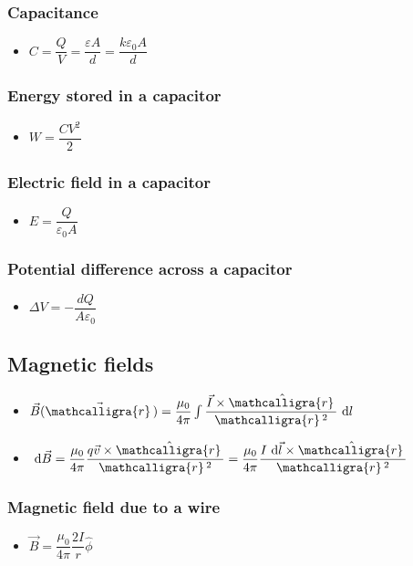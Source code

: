 \documentclass[]{report}
\newcommand \tab[1][1cm]{\hspace*{#1}}
\newcommand{\dn}[1]{\ \mathrm{d}#1}
\newcommand{\itemt}{\item \tab}
\newcommand{\scriptr}{\mathcalligra{r}\,}
\begin{document}
\subsubsection{Capacitance}
\begin{itemize}
\itemt \( C = \dfrac{Q}{V} = \dfrac{\varepsilon A}{d} = \dfrac{k\varepsilon_0A}{d} \)
\end{itemize}

\subsubsection{Energy stored in a capacitor}
\begin{itemize}
\itemt \( W = \dfrac{CV^2}{2} \)
\end{itemize}

\subsubsection{Electric field in a capacitor}
\begin{itemize}
\itemt \( E = \dfrac{Q}{\varepsilon_0 A} \)
\end{itemize}

\subsubsection{Potential difference across a capacitor}
\begin{itemize}
\itemt \( \Delta V = -\dfrac{dQ}{A\varepsilon_0} \)
\end{itemize}
				
		\subsection{Magnetic fields}
        
\begin{itemize}
\itemt \( \vec{B}(\vec{\scriptr}) = \dfrac{\mu_0}{4\pi} \int \dfrac{\vec{I}\times\hat{\scriptr}}{\scriptr^2} \dn l \)
\itemt \( \dn \vec{B} = \dfrac{\mu_0}{4\pi} \dfrac{q\vec{v}\times\hat{\scriptr}}{\scriptr^2} = \dfrac{\mu_0}{4\pi} \dfrac{I\dn\vec{l}\times\hat{\scriptr}}{\scriptr^2} \)
\end{itemize}

\subsubsection{Magnetic field due to a wire}
\begin{itemize}
\itemt \( \vec{B} = \dfrac{\mu_0}{4\pi} \dfrac{2I}{r} \hat{\phi} \)
\end{itemize}
\end{document}
